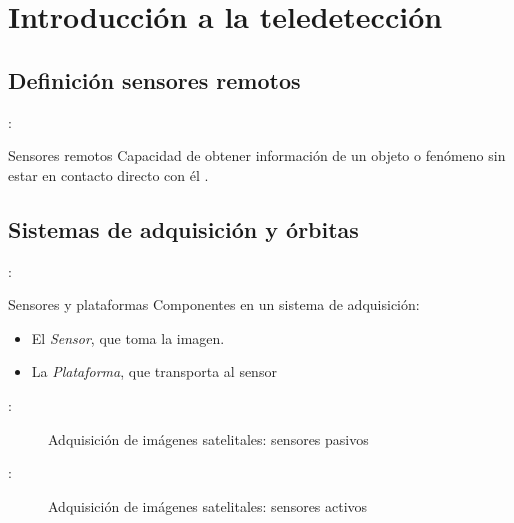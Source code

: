 \section{Introducción a la teledetección}

\subsection{Definición sensores remotos}
\begin{frame}{\secname : \subsecname}
\begin{block}{Sensores remotos}
 Capacidad de obtener información de un objeto o fenómeno sin estar en contacto directo con él .
\end{block}

\end{frame}

\subsection{Sistemas de adquisición y órbitas}

\begin{frame}{\secname : \subsecname}

\begin{block}{Sensores y plataformas}
  Componentes en un sistema de adquisición:
  \begin{itemize}
    \item El \emph{Sensor}, que toma la imagen.
    \item La \emph{Plataforma}, que transporta al sensor
  \end{itemize}
\end{block}

\end{frame}



\begin{frame}{\secname : \subsecname}
  \begin{figure}
    \centering
    \caption{Adquisición de imágenes satelitales: sensores pasivos}
    \label{}
  \end{figure}
\end{frame}

\begin{frame}{\secname : \subsecname}
  \begin{figure}
    \centering
    \caption{Adquisición de imágenes satelitales: sensores activos}
    \label{}
  \end{figure}
\end{frame}

